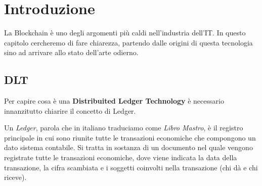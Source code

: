 \chapter{Introduzione}
\label{chap:Introduzione}


La Blockchain è uno degli argomenti più caldi nell'industria dell'IT. In questo 
capitolo cercheremo di fare chiarezza, partendo dalle origini di questa tecnologia
sino ad arrivare allo stato dell'arte odierno.

\section{DLT}
Per capire cosa è una \textbf{Distribuited Ledger Technology} è necessario 
innanzitutto chiarire il concetto di Ledger.

Un \textit{Ledger}, parola che in italiano traduciamo come \textit{Libro Mastro}, 
è il registro principale in cui sono riunite tutte le transazioni economiche 
che compongono un dato sistema contabile. Si tratta in sostanza di un documento
nel quale vengono registrate tutte le transazioni economiche, dove viene
indicata la data della transazione, la cifra scambiata e i soggetti coinvolti 
nella transazione (chi dà e chi riceve).
